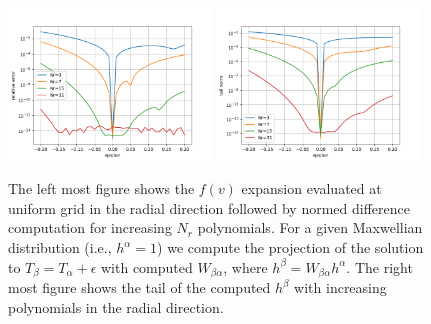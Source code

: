 \documentclass{article}
\begin{document}
\begin{figure}[!htbp]
	\centering
	\includegraphics[width=0.48\textwidth]{fig/basis_1ev_grid.png}
	\includegraphics[width=0.48\textwidth]{fig/basis_1ev_tail.png}
	\caption{The left most figure shows the $f(v)$ expansion evaluated at uniform grid in the radial direction followed by normed difference computation for increasing $N_r$ polynomials. For a given Maxwellian distribution (i.e., $h^{\alpha}=1$) we compute the projection of the solution to $T_\beta=T_\alpha + \epsilon$ with computed $W_{\beta\alpha}$, where $h^{\beta} = W_{\beta \alpha} h^{\alpha}$. The right most figure shows the tail of the computed $h^{\beta}$ with increasing polynomials in the radial direction.  \label{fig:basis_projection_error}
	}
\end{figure}
\end{document}
